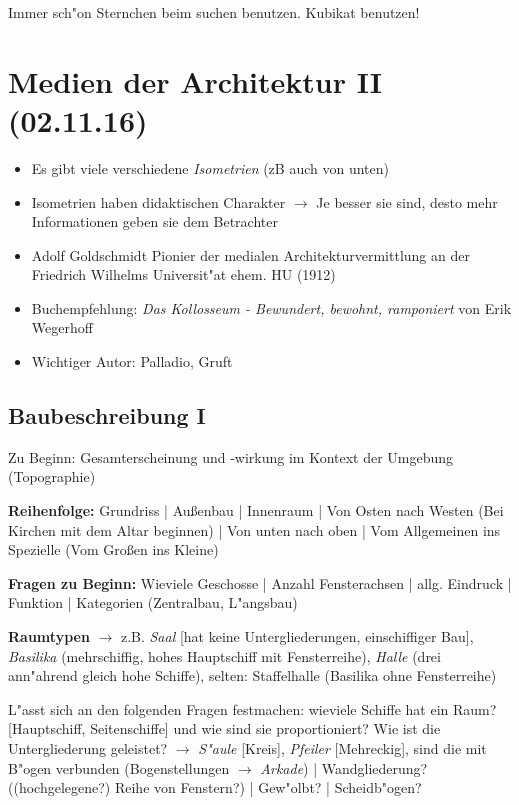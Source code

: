\documentclass[emulatestandardclasses]{scrartcl}
\begin{document}
Immer sch"on Sternchen beim suchen benutzen.
Kubikat benutzen!


\section{Medien der Architektur II\\(02.11.16)}

\begin{itemize}
  \item Es gibt viele verschiedene \emph{Isometrien} (zB auch von unten)
  \item Isometrien haben didaktischen Charakter $\rightarrow$ Je besser sie sind, desto mehr Informationen geben sie dem Betrachter
  \item Adolf Goldschmidt Pionier der medialen Architekturvermittlung an der Friedrich Wilhelms Universit"at ehem. HU (1912)
  \item Buchempfehlung: \emph{Das Kollosseum - Bewundert, bewohnt, ramponiert} von Erik Wegerhoff
  \item Wichtiger Autor: Palladio, Gruft
\end{itemize}

\subsection{Baubeschreibung I}

Zu Beginn: Gesamterscheinung und -wirkung im Kontext der Umgebung (Topographie)


\textbf{Reihenfolge:} Grundriss | Au\ss enbau | Innenraum | Von Osten nach Westen (Bei Kirchen mit dem Altar beginnen) | Von unten nach oben | Vom Allgemeinen ins Spezielle (Vom Gro\ss en ins Kleine)

\textbf{Fragen zu Beginn:} Wieviele Geschosse | Anzahl Fensterachsen | allg. Eindruck | Funktion | Kategorien (Zentralbau, L"angsbau) 

\textbf{Raumtypen} $\rightarrow$ z.B. \emph{Saal} [hat keine Untergliederungen, einschiffiger Bau], \emph{Basilika} (mehrschiffig, hohes Hauptschiff mit Fensterreihe), \emph{Halle} (drei ann"ahrend gleich hohe Schiffe), selten: Staffelhalle (Basilika ohne Fensterreihe)

L"asst sich an den folgenden Fragen festmachen: wieviele Schiffe hat ein Raum? [Hauptschiff, Seitenschiffe] und wie sind sie proportioniert? Wie ist die Untergliederung geleistet? $\rightarrow$ \emph{S"aule} [Kreis], \emph{Pfeiler} [Mehreckig], sind die mit B"ogen verbunden (Bogenstellungen $\rightarrow$ \emph{Arkade}) | Wandgliederung? ((hochgelegene?) Reihe von Fenstern?) | Gew"olbt? | Scheidb"ogen? 
\end{document}
